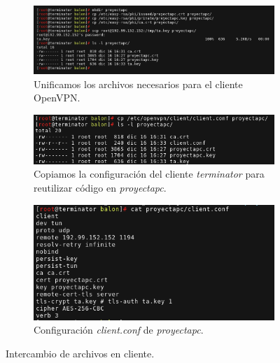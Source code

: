 \documentclass[a4paper, 11pt, titlepage]{article}
\begin{document}
        \begin{figure}[htp]
        \centering
            \begin{subfigure}[b]{1\linewidth}
            \includegraphics[width=1\textwidth]{resources/windows03.png}
            \caption{Unificamos los archivos necesarios para el cliente OpenVPN.}
            \end{subfigure}

            \begin{subfigure}[b]{0.8\linewidth}
            \includegraphics[width=1\textwidth]{resources/windows04.png}
            \caption{Copiamos la configuración del cliente \textit{terminator} para reutilizar
            código en \textit{proyectapc}.}
            \end{subfigure}

            \begin{subfigure}[b]{0.7\linewidth}
            \includegraphics[width=1\textwidth]{resources/windows05.png}
            \caption{Configuración \textit{client.conf} de \textit{proyectapc}.}
            \end{subfigure}
        \caption{Intercambio de archivos en cliente.}
        \label{fig:windows0305}
        \end{figure}
\end{document}
